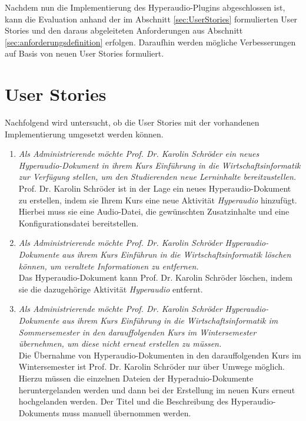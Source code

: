 \label{cap:evaluation}
Nachdem nun die Implementierung des Hyperaudio-Plugins abgeschlossen ist, kann die Evaluation anhand der im Abschnitt \ref{sec:UserStories} formulierten User Stories und den daraus abgeleiteten Anforderungen aus Abschnitt \ref{sec:anforderungsdefinition} erfolgen. Daraufhin werden mögliche Verbesserungen auf Basis von neuen User Stories formuliert.

\section{User Stories}
Nachfolgend wird untersucht, ob die User Stories mit der vorhandenen Implementierung umgesetzt werden können.

\begin{enumerate}[label=US-\arabic*:,ref=US-\arabic*]

\item \label{US-Admin-Erstellen-Eval} \textit{Als Administrierende möchte Prof. Dr. Karolin Schröder ein neues Hyperaudio-Dokument in ihrem Kurs \glqq Einführung in die Wirtschaftsinformatik\grqq{} zur Verfügung stellen, um den Studierenden neue Lerninhalte bereitzustellen.}\\
Prof. Dr. Karolin Schröder ist in der Lage ein neues Hyperaudio-Dokument zu erstellen, indem sie Ihrem Kurs eine neue Aktivität \textit{Hyperaudio} hinzufügt. Hierbei muss sie eine Audio-Datei, die gewünschten Zusatzinhalte und eine Konfigurationsdatei bereitstellen.


\item \label{US-Admin-Loeschen-Eval} \textit{Als Administrierende möchte Prof. Dr. Karolin Schröder Hyperaudio-Dokumente aus ihrem Kurs \glqq Einführun in die Wirtschaftsinformatik\grqq{} löschen können, um veraltete Informationen zu entfernen.}\\
Das Hyperaudio-Dokument kann Prof. Dr. Karolin Schröder löschen, indem sie die dazugehörige Aktivität \textit{Hyperaudio} entfernt.

\item \label{US-Admin-Semester-Eval} \textit{Als Administrierende möchte Prof. Dr. Karolin Schröder Hyperaudio-Dokumente aus ihrem Kurs \glqq Einführung in die Wirtschaftsinformatik\grqq{} im Sommersemester in den darauffolgenden Kurs im Wintersemester übernehmen, um diese nicht erneut erstellen zu müssen.}\\
Die Übernahme von Hyperaudio-Dokumenten in den darauffolgenden Kurs im Wintersemester ist Prof. Dr. Karolin Schröder nur über Umwege möglich. Hierzu müssen die einzelnen Dateien der Hyperaduio-Dokumente heruntergelanden werden und dann bei der Erstellung im neuen Kurs erneut hochgelanden werden. Der Titel und die Beschreibung des Hyperaudio-Dokuments muss manuell übernommen werden.


\end{enumerate}
